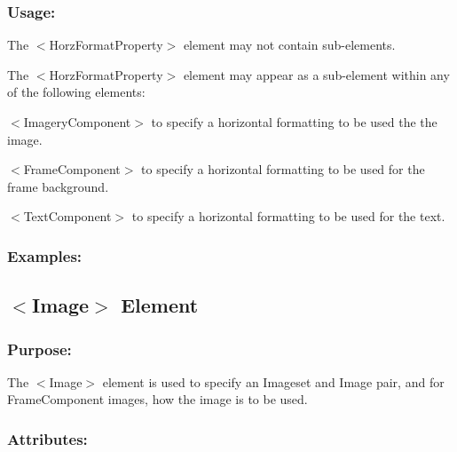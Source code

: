 \hypertarget{fal_element_ref_fal_elem_ref_sec_17_3}{}\subsubsection{Usage\+:}\label{fal_element_ref_fal_elem_ref_sec_17_3}

\begin{DoxyItemize}
\item The {\ttfamily $<$Horz\+Format\+Property$>$} element may not contain sub-\/elements.


\item The {\ttfamily $<$Horz\+Format\+Property$>$} element may appear as a sub-\/element within any of the following elements\+: 
\begin{DoxyItemize}
\item {\ttfamily $<$Imagery\+Component$>$} to specify a horizontal formatting to be used the the image. 
\item {\ttfamily $<$Frame\+Component$>$} to specify a horizontal formatting to be used for the frame background. 
\item {\ttfamily $<$Text\+Component$>$} to specify a horizontal formatting to be used for the text. 
\end{DoxyItemize}
\end{DoxyItemize}\hypertarget{fal_element_ref_fal_elem_ref_sec_17_4}{}\subsubsection{Examples\+:}\label{fal_element_ref_fal_elem_ref_sec_17_4}
\hypertarget{fal_element_ref_fal_elem_ref_sec_18}{}\subsection{$<$\+Image$>$ Element}\label{fal_element_ref_fal_elem_ref_sec_18}
\hypertarget{fal_element_ref_fal_elem_ref_sec_18_1}{}\subsubsection{Purpose\+:}\label{fal_element_ref_fal_elem_ref_sec_18_1}
The {\ttfamily $<$Image$>$} element is used to specify an Imageset and Image pair, and for Frame\+Component images, how the image is to be used.\hypertarget{fal_element_ref_fal_elem_ref_sec_18_2}{}\subsubsection{Attributes\+:}\label{fal_element_ref_fal_elem_ref_sec_18_2}
